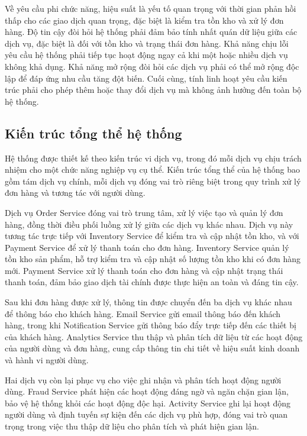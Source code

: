 Về yêu cầu phi chức năng, hiệu suất là yếu tố quan trọng với thời gian phản hồi thấp cho các giao dịch quan trọng, đặc biệt là kiểm tra tồn kho và xử lý đơn hàng. Độ tin cậy đòi hỏi hệ thống phải đảm bảo tính nhất quán dữ liệu giữa các dịch vụ, đặc biệt là đối với tồn kho và trạng thái đơn hàng. Khả năng chịu lỗi yêu cầu hệ thống phải tiếp tục hoạt động ngay cả khi một hoặc nhiều dịch vụ không khả dụng. Khả năng mở rộng đòi hỏi các dịch vụ phải có thể mở rộng độc lập để đáp ứng nhu cầu tăng đột biến. Cuối cùng, tính linh hoạt yêu cầu kiến trúc phải cho phép thêm hoặc thay đổi dịch vụ mà không ảnh hưởng đến toàn bộ hệ thống.

\subsection{Kiến trúc tổng thể hệ thống}
Hệ thống được thiết kế theo kiến trúc vi dịch vụ, trong đó mỗi dịch vụ chịu trách nhiệm cho một chức năng nghiệp vụ cụ thể. Kiến trúc tổng thể của hệ thống bao gồm tám dịch vụ chính, mỗi dịch vụ đóng vai trò riêng biệt trong quy trình xử lý đơn hàng và tương tác với người dùng.

Dịch vụ Order Service đóng vai trò trung tâm, xử lý việc tạo và quản lý đơn hàng, đồng thời điều phối luồng xử lý giữa các dịch vụ khác nhau. Dịch vụ này tương tác trực tiếp với Inventory Service để kiểm tra và cập nhật tồn kho, và với Payment Service để xử lý thanh toán cho đơn hàng. Inventory Service quản lý tồn kho sản phẩm, hỗ trợ kiểm tra và cập nhật số lượng tồn kho khi có đơn hàng mới. Payment Service xử lý thanh toán cho đơn hàng và cập nhật trạng thái thanh toán, đảm bảo giao dịch tài chính được thực hiện an toàn và đáng tin cậy.

Sau khi đơn hàng được xử lý, thông tin được chuyển đến ba dịch vụ khác nhau để thông báo cho khách hàng. Email Service gửi email thông báo đến khách hàng, trong khi Notification Service gửi thông báo đẩy trực tiếp đến các thiết bị của khách hàng. Analytics Service thu thập và phân tích dữ liệu từ các hoạt động của người dùng và đơn hàng, cung cấp thông tin chi tiết về hiệu suất kinh doanh và hành vi người dùng.

Hai dịch vụ còn lại phục vụ cho việc ghi nhận và phân tích hoạt động người dùng. Fraud Service phát hiện các hoạt động đáng ngờ và ngăn chặn gian lận, bảo vệ hệ thống khỏi các hoạt động độc hại. Activity Service ghi lại hoạt động người dùng và định tuyến sự kiện đến các dịch vụ phù hợp, đóng vai trò quan trọng trong việc thu thập dữ liệu cho phân tích và phát hiện gian lận.

